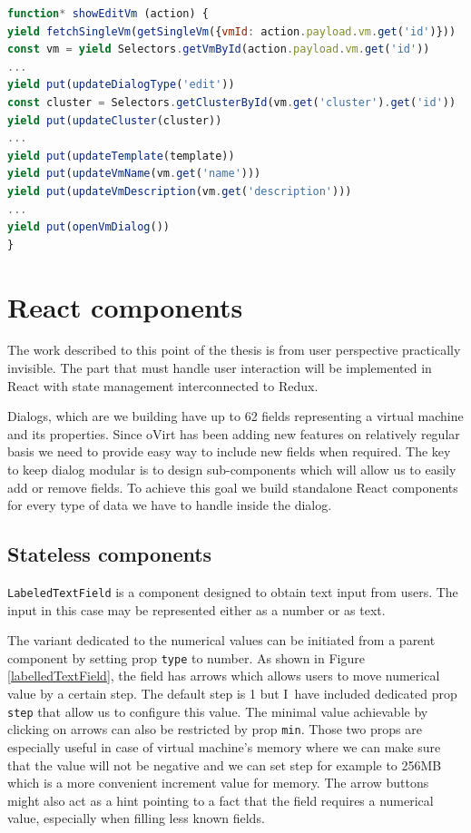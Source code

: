 \bigskip
\begin{lstlisting}[language=javascript,xleftmargin=3.5ex,caption={Saga responsible for initiating and showing the Edit VM dialog }]
function* showEditVm (action) {
yield fetchSingleVm(getSingleVm({vmId: action.payload.vm.get('id')}))
const vm = yield Selectors.getVmById(action.payload.vm.get('id'))
...
yield put(updateDialogType('edit'))
const cluster = Selectors.getClusterById(vm.get('cluster').get('id'))
yield put(updateCluster(cluster))
...
yield put(updateTemplate(template))
yield put(updateVmName(vm.get('name')))
yield put(updateVmDescription(vm.get('description')))
...
yield put(openVmDialog())
}
\end{lstlisting}\label{editVmSaga}
\bigskip

\section{React components}
The work described to this point of the thesis is from user perspective practically invisible. The part that must handle user interaction will be implemented in React with state management interconnected to Redux. 

Dialogs, which are we building have up to 62 fields representing a virtual machine and its properties. Since oVirt has been adding new features on relatively regular basis we need to provide easy way to include new fields when required. The key to keep dialog modular is to design sub-components which will allow us to easily add or remove fields. To achieve this goal we build standalone React components for every type of data we have to handle inside the dialog.

\subsection{Stateless components}
\texttt{LabeledTextField} is a component designed to obtain text input from users. The input in this case may be represented either as a number or as text.

The variant dedicated to the numerical values can be initiated from a parent component by setting prop \texttt{type} to number. As shown in Figure~ \ref{labelledTextField}, the field has arrows which allows users to move numerical value by a certain step. The default step is 1 but I~have included dedicated prop \texttt{step} that allow us to configure this value. The minimal value achievable by clicking on arrows can also be restricted by prop \texttt{min}. Those two props are especially useful in case of virtual machine's memory where we can make sure that the value will not be negative and we can set step for example to 256MB which is a more convenient increment value for memory. 
The arrow buttons might also act as a hint pointing to a fact that the field requires a numerical value, especially when filling less known fields.

